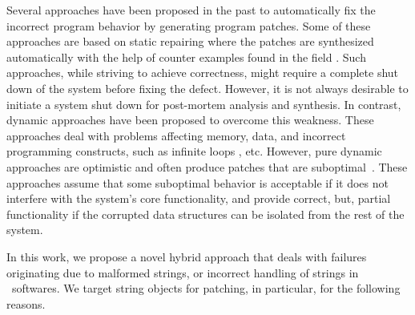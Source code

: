 
Several approaches have been proposed in the past to automatically fix the
incorrect program behavior by generating program patches. Some of these
approaches are based on static repairing where the patches are synthesized
automatically with the help of counter examples found in the field
\cite{wei-issta-2010}. Such approaches, while striving to achieve correctness,
might require a complete shut down of the system before fixing the defect.
However, it is not always desirable to initiate a system shut down for
post-mortem analysis and synthesis. In contrast, dynamic approaches have been
proposed to overcome this weakness. These approaches deal with problems
affecting memory, data, and incorrect programming constructs, such as infinite
loops \cite{Carbin:2011, KlingMCR12, conf/sosp/PerkinsKLABCPSSSWZER09}, etc.
However, pure dynamic approaches are optimistic and often produce patches that
are suboptimal~\cite{conf/pldi/LongSR14}. These approaches assume
that some suboptimal behavior is acceptable if it does not interfere with the
system's core functionality, and provide correct, but, partial functionality if
the corrupted data structures can be isolated from the rest of the system.

In this work, we propose a novel hybrid approach that deals with failures
originating due to malformed strings, or incorrect handling of strings in \java\
softwares. We target string objects for patching, in particular, for the
following reasons.

